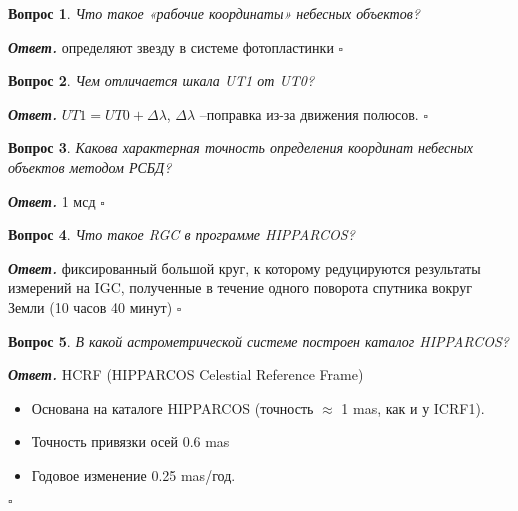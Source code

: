 \documentclass[12pt]{article}
\newtheorem{problem}{Вопрос}
\newenvironment{solution}[1][\it{Ответ}]{\textbf{#1. } }{$\square$}
\begin{document}
		\begin{problem}
			Что такое «рабочие координаты»
			небесных объектов?
		\end{problem}
		
		\begin{solution}
			определяют
			звезду в системе фотопластинки		
		\end{solution}
		
		\begin{problem}
			Чем отличается шкала UT1 от
			UT0?
		\end{problem}
		
		\begin{solution}
			$UT1=UT0+\Delta\lambda$, $\Delta\lambda$ --поправка из-за движения полюсов.
		\end{solution}
		
		\begin{problem}
			Какова характерная точность
			определения координат небесных
			объектов методом РСБД?
		\end{problem}
		
		\begin{solution}
			1 мсд	
		\end{solution}
		
		\begin{problem}
			Что такое RGC в программе
			HIPPARCOS?
		\end{problem}
		
		\begin{solution}
			фиксированный
			большой круг, к которому
			редуцируются результаты измерений
			на IGC, полученные в течение одного поворота
			спутника вокруг Земли (10 часов 40 минут)
		\end{solution}
		
		\begin{problem}
			В какой астрометрической
			системе построен каталог
			HIPPARCOS? 
		\end{problem}
		
		\begin{solution}
			HCRF (HIPPARCOS Celestial Reference Frame)
			\begin{itemize}
			\item Основана на каталоге HIPPARCOS (точность $\approx$ 1 mas, как и у ICRF1).
			\item Точность привязки осей 0.6 mas
			\item Годовое изменение 0.25 mas/год.
			\end{itemize}		
		\end{solution}
		
\end{document}
